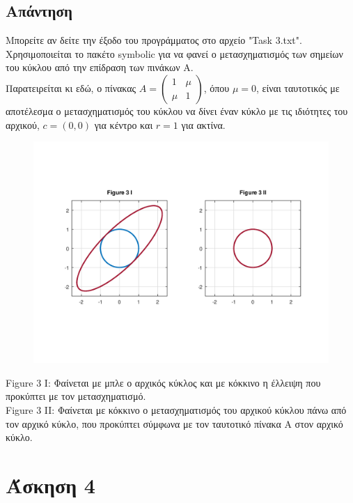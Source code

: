 \documentclass[a4paper,12pt]{article}
\begin{document}
\subsection{Απάντηση}
Μπορείτε αν δείτε την έξοδο του προγράμματος στο αρχείο "Task 3.txt".\\
Χρησιμοποιείται το πακέτο symbolic για να φανεί ο μετασχηματισμός των σημείων
του κύκλου από την επίδραση των πινάκων Α.\\
Παρατειρείται κι εδώ, ο πίνακας $
	A = \begin{pmatrix}
		1   & \mu \\
		\mu & 1
	\end{pmatrix}
$, όπου $\mu = 0$, είναι ταυτοτικός με αποτέλεσμα ο μετασχηματισμός του κύκλου
να δίνει έναν κύκλο με τις ιδιότητες του αρχικού, $c=(0, 0)$ για κέντρο και
$r=1$ για ακτίνα.
\begin{center}
	\begin{figure}[H]
		\centering
		\includegraphics[scale=0.8]{3i_ii.png}
	\end{figure}
	Figure 3 I: Φαίνεται με μπλε ο αρχικός κύκλος και με κόκκινο η έλλειψη που
	προκύπτει με τον μετασχηματισμό.\\
	Figure 3 II: Φαίνεται με κόκκινο ο μετασχηματισμός του αρχικού κύκλου πάνω
	από τον αρχικό κύκλο, που προκύπτει σύμφωνα με τον ταυτοτικό πίνακα Α
	στον αρχικό κύκλο.
\end{center}
\newpage\section{Άσκηση 4}
\end{document}

